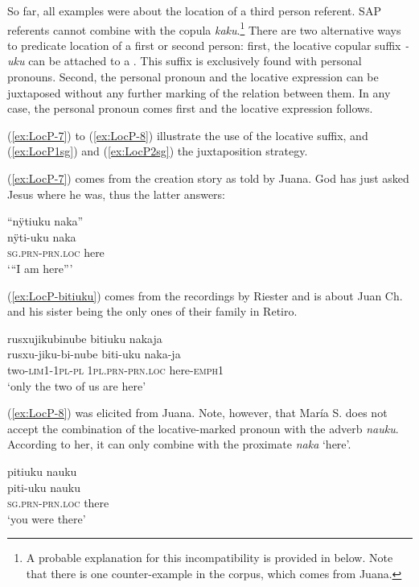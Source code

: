 So far, all examples were about the location of a third person referent. SAP referents cannot combine with the copula \textit{kaku}.\footnote{A probable explanation for this incompatibility is provided in  below. Note that there is one counter-example in the corpus, which comes from Juana.} There are two alternative ways to predicate location of a first or second person: first, the locative copular suffix \textit{-uku} can be attached to a . This suffix is exclusively found with personal pronouns. Second, the personal pronoun and the locative expression can be juxtaposed without any further marking of the relation between them. In any case, the personal pronoun comes first and the locative expression follows.

(\ref{ex:LocP-7}) to (\ref{ex:LocP-8}) illustrate the use of the locative suffix, and (\ref{ex:LocP1sg}) and (\ref{ex:LocP2sg}) the juxtaposition strategy.

(\ref{ex:LocP-7}) comes from the creation story as told by Juana. God has just asked Jesus where he was, thus the latter answers:

\ea\label{ex:LocP-7}
\begingl
\glpreamble “nÿtiuku naka”\\
\gla nÿti-uku naka\\
\textsc{sg.prn}-\textsc{prn.loc} here\\
\glft ‘“I am here”’
\endgl
\trailingcitation{[jxx-n101013s-1.467]}
\xe

(\ref{ex:LocP-bitiuku}) comes from the recordings by Riester and is about Juan Ch. and his sister being the only ones of their family in Retiro.

\ea\label{ex:LocP-bitiuku}
\begingl 
\glpreamble rusxujikubinube bitiuku nakaja\\
\gla rusxu-jiku-bi-nube biti-uku naka-ja\\ 
\glb two-\textsc{lim}1-1\textsc{pl}-\textsc{pl} 1\textsc{pl.prn}-\textsc{prn.loc} here-\textsc{emph}1\\ 
\glft ‘only the two of us are here’
\trailingcitation{[nxx-p630101g-1.165]}
\xe

(\ref{ex:LocP-8}) was elicited from Juana. Note, however, that María S. does not accept the combination of the locative-marked pronoun with the adverb \textit{nauku}. According to her, it can only combine with the proximate \textit{naka} ‘here’.

\ea\label{ex:LocP-8}
\begingl
\glpreamble pitiuku nauku\\
\gla piti-uku nauku\\
\textsc{sg.prn}-\textsc{prn.loc} there\\
\glft ‘you were there’
\endgl
\trailingcitation{[jxx-p150920l.108]}
\xe

